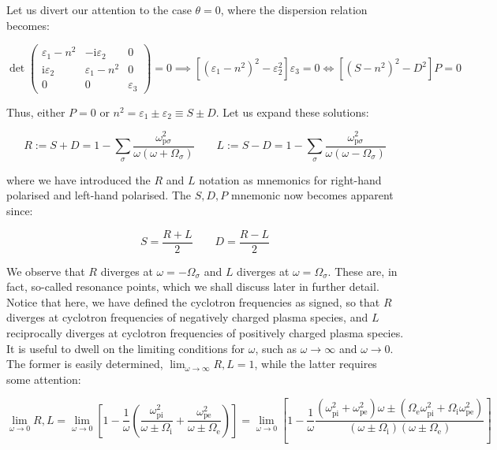 Let us divert our attention to the case $\theta=0$, where the dispersion relation becomes:

\begin{equation}
    \det{\begin{pmatrix}
        \varepsilon_1-n^2 & -\mathrm{i}\varepsilon_2 & 0\\
        \mathrm{i}\varepsilon_2 & \varepsilon_1-n^2 & 0\\
        0 & 0 & \varepsilon_3
    \end{pmatrix}}=0\implies\left[(\varepsilon_1-n^2)^2-\varepsilon_2^2\right]\varepsilon_3=0\Longleftrightarrow\left[(S-n^2)^2-D^2\right]P=0
\end{equation}

Thus, either $P=0$ or $n^2=\varepsilon_1\pm\varepsilon_2\equiv S\pm D$. Let us expand these solutions:

\begin{equation}
    R:=S+D=1-\sum_\sigma\frac{\omega_{\mathrm{p}\sigma}^2}{\omega(\omega+\Omega_\sigma)}\qquad L:=S-D=1-\sum_\sigma\frac{\omega_{\mathrm{p}\sigma}^2}{\omega(\omega-\Omega_\sigma)}
\end{equation}

where we have introduced the $R$ and $L$ notation as mnemonics for right-hand polarised and left-hand polarised. The $S,D,P$ mnemonic now becomes apparent since:

\begin{equation}
    S=\frac{R+L}{2}\qquad D=\frac{R-L}{2}
\end{equation}

We observe that $R$ diverges at $\omega=-\Omega_\sigma$ and $L$ diverges at $\omega=\Omega_\sigma$. These are, in fact, so-called resonance points, which we shall discuss later in further detail. Notice that here, we have defined the cyclotron frequencies as signed, so that $R$ diverges at cyclotron frequencies of negatively charged plasma species, and $L$ reciprocally diverges at cyclotron frequencies of positively charged plasma species. It is useful to dwell on the limiting conditions for $\omega$, such as $\omega\to\infty$ and $\omega\to0$. The former is easily determined, $\lim_{\omega\to\infty}R,L=1$, while the latter requires some attention:

\begin{equation}
    \lim_{\omega\to0}R,L=\lim_{\omega\to0}\left[1-\frac{1}{\omega}\left(\frac{\omega_\text{pi}^2}{\omega\pm\Omega_\mathrm{i}}+\frac{\omega_\text{pe}^2}{\omega\pm\Omega_\text{e}}\right)\right]=\lim_{\omega\to0}\left[1-\frac{1}{\omega}\frac{(\omega_\text{pi}^2+\omega_\text{pe}^2)\omega\pm(\Omega_\text{e}\omega_\text{pi}^2+\Omega_\mathrm{i}\omega_\text{pe}^2)}{(\omega\pm\Omega_\mathrm{i})(\omega\pm\Omega_\text{e})}\right]
\end{equation}


